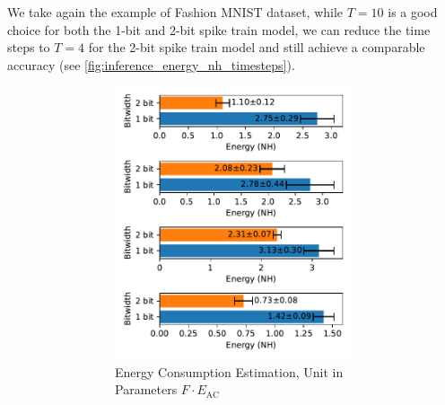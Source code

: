         We take again the example of Fashion MNIST dataset, while $T=10$ is a good choice for both the 1-bit and 2-bit spike train model, we can reduce the time steps to $T=4$ for the 2-bit spike train model and still achieve a comparable accuracy (see \ref{fig:inference_energy_nh_timesteps}). 
        \begin{figure}[!htpb]
            \centering
            \begin{subfigure}[H]{\textwidth}
                \centering
                \begin{subfigure}[H]{0.49\textwidth}
                    \includegraphics[width=\textwidth]{../timesteps/FashionMNIST/plots/fashionmnist_test_energy_nh.pdf}
                    \caption{Energy Consumption Estimation, Unit in Parameters $F\cdot E_{\text{AC}}$}
                \end{subfigure}
                \hfill
                \begin{subfigure}[H]{0.49\textwidth}

\end{subfigure}
\end{subfigure}
\end{figure}
